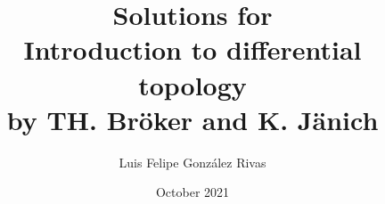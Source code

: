 \documentclass[12p]{report}
\begin{document}
\title{Solutions for \\ Introduction to differential topology \\ by TH. Bröker and K. Jänich}
\author{Luis Felipe González Rivas}
\date{October 2021}
\maketitle

\tableofcontents






\end{document}
